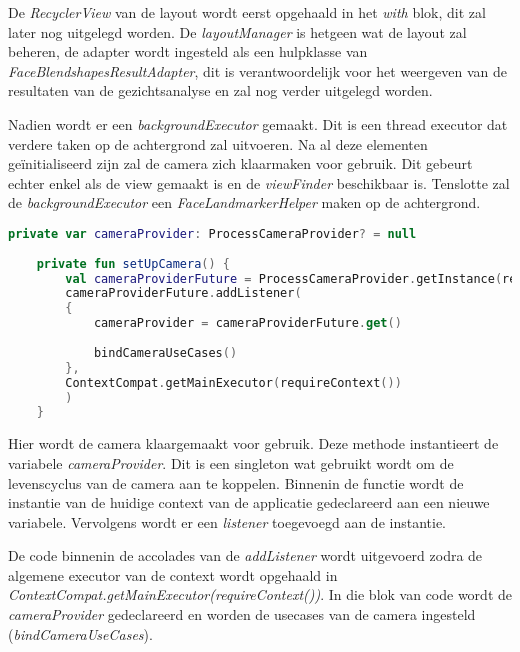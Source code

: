 De \emph{RecyclerView} van de layout wordt eerst opgehaald in het \emph{with} blok, dit zal later nog uitgelegd worden. De \emph{layoutManager} is hetgeen wat de layout zal beheren, de adapter wordt ingesteld als een hulpklasse van \emph{FaceBlendshapesResultAdapter}, dit is verantwoordelijk voor het weergeven van de resultaten van de gezichtsanalyse en zal nog verder uitgelegd worden.

Nadien wordt er een \emph{backgroundExecutor} gemaakt. Dit is een thread executor dat verdere taken op de achtergrond zal uitvoeren. Na al deze elementen geïnitialiseerd zijn zal de camera zich klaarmaken voor gebruik. Dit gebeurt echter enkel als de view gemaakt is en de \emph{viewFinder} beschikbaar is. Tenslotte zal de \emph{backgroundExecutor} een \emph{FaceLandmarkerHelper} maken op de achtergrond.

\begin{lstlisting}[language=Kotlin, caption=setUpCamera in CameraFragment.kt]
    private var cameraProvider: ProcessCameraProvider? = null
    
    private fun setUpCamera() {
        val cameraProviderFuture = ProcessCameraProvider.getInstance(requireContext())
        cameraProviderFuture.addListener(
        {
            cameraProvider = cameraProviderFuture.get()
            
            bindCameraUseCases()
        },
        ContextCompat.getMainExecutor(requireContext())
        )
    }
\end{lstlisting}
Hier wordt de camera klaargemaakt voor gebruik. Deze methode instantieert de variabele \emph{cameraProvider}. Dit is een singleton wat gebruikt wordt om de levenscyclus van de camera aan te koppelen. Binnenin de functie wordt de instantie van de huidige context van de applicatie gedeclareerd aan een nieuwe variabele. Vervolgens wordt er een \emph{listener} toegevoegd aan de instantie.

De code binnenin de accolades van de \emph{addListener} wordt uitgevoerd zodra de algemene executor van de context wordt opgehaald in \emph{ContextCompat.getMainExecutor(requireContext())}. In die blok van code wordt de \emph{cameraProvider} gedeclareerd en worden de usecases van de camera ingesteld (\emph{bindCameraUseCases}).

